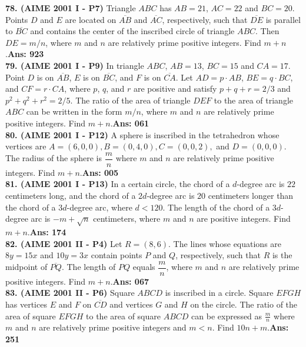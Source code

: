 \documentclass[letterpaper,10pt,addpoints]{exam}
\begin{document}
\textbf{78. (AIME 2001 I - P7) }Triangle $ABC$ has $AB=21$, $AC=22$ and $BC=20$. Points $D$ and $E$ are located on $\overline{AB}$ and $\overline{AC}$, respectively, such that $\overline{DE}$ is parallel to $\overline{BC}$ and contains the center of the inscribed circle of triangle $ABC$. Then $DE=m/n$, where $m$ and $n$ are relatively prime positive integers. Find $m+n$.\quad\textbf{Ans: 923}\\

\textbf{79. (AIME 2001 I - P9) }In triangle $ABC$, $AB=13$, $BC=15$ and $CA=17$. Point $D$ is on $\overline{AB}$, $E$ is on $\overline{BC}$, and $F$ is on $\overline{CA}$. Let $AD=p\cdot AB$, $BE=q\cdot BC$, and $CF=r\cdot CA$, where $p$, $q$, and $r$ are positive and satisfy $p+q+r=2/3$ and $p^2+q^2+r^2=2/5$. The ratio of the area of triangle $DEF$ to the area of triangle $ABC$ can be written in the form $m/n$, where $m$ and $n$ are relatively prime positive integers. Find $m+n$.\quad\textbf{Ans: 061}\\

\textbf{80. (AIME 2001 I - P12) }A sphere is inscribed in the tetrahedron whose vertices are $A = (6,0,0), B = (0,4,0), C = (0,0,2),$ and $D = (0,0,0).$ The radius of the sphere is $\dfrac{m}{n}$ where $m$ and $n$ are relatively prime positive integers. Find $m + n.$\quad\textbf{Ans: 005}\\

\textbf{81. (AIME 2001 I - P13) }In a certain circle, the chord of a $d$-degree arc is $22$ centimeters long, and the chord of a $2d$-degree arc is $20$ centimeters longer than the chord of a $3d$-degree arc, where $d < 120.$ The length of the chord of a $3d$-degree arc is $- m + \sqrt {n}$ centimeters, where $m$ and $n$ are positive integers. Find $m + n.$\quad\textbf{Ans: 174}\\

\textbf{82. (AIME 2001 II - P4) }Let $R = (8,6)$. The lines whose equations are $8y = 15x$ and $10y = 3x$ contain points $P$ and $Q$, respectively, such that $R$ is the midpoint of $\overline{PQ}$. The length of $PQ$ equals $\dfrac {m}{n}$, where $m$ and $n$ are relatively prime positive integers. Find $m + n$.\quad\textbf{Ans: 067}\\

\textbf{83. (AIME 2001 II - P6) }Square $ABCD$ is inscribed in a circle. Square $EFGH$ has vertices $E$ and $F$ on $\overline{CD}$ and vertices $G$ and $H$ on the circle. The ratio of the area of square $EFGH$ to the area of square $ABCD$ can be expressed as $\frac {m}{n}$ where $m$ and $n$ are relatively prime positive integers and $m < n$. Find $10n + m$.\quad\textbf{Ans: 251}\\
\end{document}
